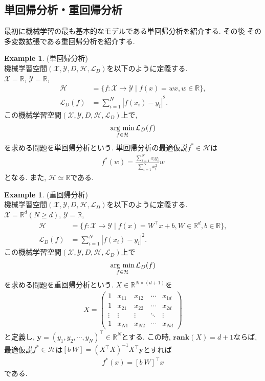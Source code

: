 \documentclass[11pt, a4paper, dvipdfmx]{jsarticle}
\theoremstyle{definition}
\newtheorem{Example+}[Axiom+]{Example}
\newcommand{\R}{\mathbb{R}}
\newcommand{\X}{\mathcal{X}}
\newcommand{\Y}{\mathcal{Y}}
\newcommand{\Hil}{\mathcal{H}}
\newcommand{\Loss}{\mathcal{L}_{D}}
\newcommand{\MLsp}{(\X, \Y, D, \Hil, \Loss)}
\newcommand{\argmin}{\mathop{\rm arg~min}\limits}
\begin{document}
\subsection{単回帰分析・重回帰分析}
最初に機械学習の最も基本的なモデルである単回帰分析を紹介する. その後
その多変数拡張である重回帰分析を紹介する.
\begin{Example+}(単回帰分析)\\
    機械学習空間$\MLsp$を以下のように定義する.\\
    $\X = \R$, $\Y = \R$, 
    \begin{align*}
        \Hil &= \{f:\X\to\Y\mid f(x) = wx, w\in\R\},\\
        \Loss(f) &= \sum_{i = 1}^{N}|f(x_i) - y_i|^2.
    \end{align*}
    この機械学習空間$\MLsp$上で,
    \begin{align*}
        \argmin_{f\in\Hil}\Loss(f)
    \end{align*}
    を求める問題を単回帰分析という. 単回帰分析の最適仮説$f^{*}\in\Hil$は
    \begin{align*}
        f^{*}(w) = \frac{\sum_{i = 1}^{N}x_{i}y_{i}}{\sum_{i = 1}^{N}x_{i}^2}w
    \end{align*}
    となる. また, $\Hil\simeq\R$である.
\end{Example+}
\begin{Example+}(重回帰分析)\\
    機械学習空間$\MLsp$を以下のように定義する.\\
    $\X = \R^d(N\geq d)$, $\Y = \R$, 
    \begin{align*}
        \Hil &= \{f:\X\to\Y\mid f(x) = W^{\top}x + b, W\in\R^{d}, b\in\R\},\\
        \Loss(f) &= \sum_{i = 1}^{N}|f(x_i) - y_i|^2.
    \end{align*}
    この機械学習空間$\MLsp$上で
    \begin{align*}
        \argmin_{f\in\Hil}\Loss(f)
    \end{align*}
    を求める問題を重回帰分析という. $X\in\R^{N\times(d + 1)}$を
    \begin{align*}
        X = \begin{pmatrix}
            1 & x_{11} & x_{12} & \cdots & x_{1d}\\
            1 & x_{21} & x_{22} & \cdots & x_{2d}\\
            \vdots & \vdots & \vdots & \ddots & \vdots\\
            1 & x_{N1} & x_{N2} & \cdots & x_{Nd}
        \end{pmatrix}
    \end{align*}
    と定義し, $\mathbf{y} = (y_{1}, y_{2}, \cdots, y_{N})^{\top}\in\R^{N}$とする. この時, $\mathbf{rank}(X) = d + 1$ならば, 
    最適仮説$f^*\in\Hil$は$[b~W] = (X^\top X)^{-1}X^\top\mathbf{y}$とすれば
    \begin{align*}
        f^{*}(x) = [b~W]^{\top}x
    \end{align*}
    である.
\end{Example+}
\end{document}
